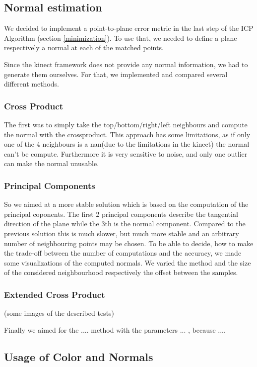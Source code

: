 \documentclass[twocolumn]{article}
\begin{document}
\subsection{Normal estimation}

We decided to implement a point-to-plane error metric in the last step of the ICP Algorithm (section \ref{minimization}). To use that, we needed to define a plane respectively a normal at each of the matched points.

Since the kinect framework does not provide any normal information, we had to generate them ourselves. For that, we implemented and compared several different methods.

\subsubsection{Cross Product}
The first was to simply take the top/bottom/right/left neighbours and compute the normal with the crossproduct.
This approach has some limitations, as if only one of the 4 neighbours is a nan(due to the limitations in the kinect) the normal can't be compute. Furthermore it is very sensitive to noise, and only one outlier can make the normal unusable.

\subsubsection{Principal Components}
So we aimed at a more stable solution which is based on the computation of the principal coponents. 
The first 2 principal components describe the tangential direction of the plane while the 3th is the normal component.
Compared to the previous solution this is much slower, but much more stable and an arbitrary number of neighbouring points may be chosen.
To be able to decide, how to make the trade-off between the number of computations and the accuracy, we made some visualizations of the computed normals.
We varied the method and the size of the considered neighbourhood respectively the offset between the samples.

\subsubsection{Extended Cross Product}

(some images of the described tests)

Finally we aimed for the .... method with the parameters ... , because ....

\subsection{Usage of Color and Normals}
\end{document}
